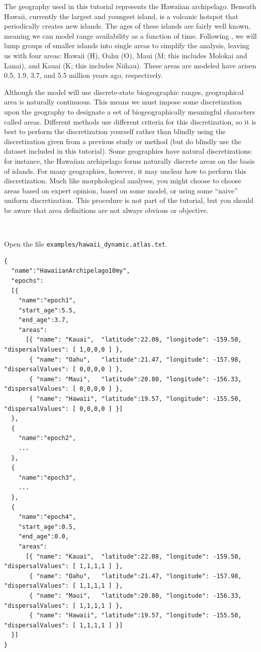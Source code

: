 \documentclass[11pt]{article}
\newcommand{\impmark}{\strut\vadjust{\domark}}
\newcommand{\domark}{%
  \vbox to 0pt{
    \kern-\dp\strutbox
    \smash{\llap{$\rightarrow$\kern1em}}
    \vss
  }%
}
\begin{document}
The geography used in this tutorial represents the Hawaiian archipelago.
Beneath Hawaii, currently the largest and youngest island, is a volcanic hotspot that periodically creates new islands.
The ages of these islands are fairly well known, meaning we can model range availability as a function of time.
Following \citet{ree08}, we will lump groups of smaller islands into single areas to simplify the analysis, leaving us with four areas: Hawaii (H), Oahu (O), Maui (M; this includes Molokai and Lanai), and Kauai (K; this includes Niihau).
These areas are modeled have arisen 0.5, 1.9, 3.7, and 5.5 million years ago, respectively.

Although the model will use discrete-state biogeographic ranges, geographical area is naturally continuous.
This means we must impose some discretization upon the geography to designate a set of biogeographically meaningful characters called areas.
Different methods use different criteria for this discretization, so it is best to perform the discretization yourself rather than blindly using the discretization given from a previous study or method (but do blindly use the dataset included in this tutorial).
Some geographies have natural discretizations: for instance, the Hawaiian archipelago forms naturally discrete areas on the basis of islands.
For many geographies, however, it may unclear how to perform this discretization.
Much like morphological analyses, you might choose to choose areas based on expert opinion, based on some model, or using some ``naive'' uniform discretization.
This procedure is not part of the tutorial, but you should be aware that area definitions are not always obvious or objective.


\newpage

\noindent \\ \impmark  Open the file \texttt{examples/hawaii\_dynamic.atlas.txt}.

\begin{framed}
\begin{lstlisting}[basicstyle=\tiny \listingsfont, columns=texcl]
{
  "name":"HawaiianArchipelago10my",
  "epochs":
  [{
    "name":"epoch1",
    "start_age":5.5,
    "end_age":3.7,
    "areas":
      [{ "name": "Kauai",  "latitude":22.08, "longitude": -159.50, "dispersalValues": [ 1,0,0,0 ] },
       { "name": "Oahu",   "latitude":21.47, "longitude": -157.98, "dispersalValues": [ 0,0,0,0 ] },
       { "name": "Maui",   "latitude":20.80, "longitude": -156.33, "dispersalValues": [ 0,0,0,0 ] },
       { "name": "Hawaii", "latitude":19.57, "longitude": -155.50, "dispersalValues": [ 0,0,0,0 ] }]
  },
  {
    "name":"epoch2",
    ...
  },
  {
    "name":"epoch3",
    ...
  },
  {
    "name":"epoch4",
    "start_age":0.5,
    "end_age":0.0,
    "areas":
      [{ "name": "Kauai",  "latitude":22.08, "longitude": -159.50, "dispersalValues": [ 1,1,1,1 ] },
       { "name": "Oahu",   "latitude":21.47, "longitude": -157.98, "dispersalValues": [ 1,1,1,1 ] },
       { "name": "Maui",   "latitude":20.80, "longitude": -156.33, "dispersalValues": [ 1,1,1,1 ] },
       { "name": "Hawaii", "latitude":19.57, "longitude": -155.50, "dispersalValues": [ 1,1,1,1 ] }]
  }]
}
\end{lstlisting}
\end{framed}
\end{document}
